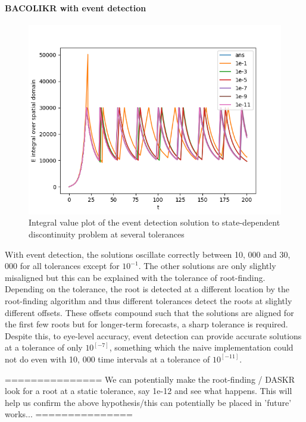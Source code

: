 \documentclass{article}
\begin{document}
\paragraph{BACOLIKR with event detection}
\begin{figure}[H]
\centering
\includegraphics[width=0.7\linewidth]{./figures/pde_state_disc_tol_event}
\caption{Integral value plot of the event detection solution to state-dependent discontinuity problem at several tolerances}
\label{fig:pde_state_disc_tol_event}
\end{figure}

With event detection, the solutions oscillate correctly between 10, 000 and 30, 000 for all tolerances except for $10^{-1}$. The other solutions are only slightly misaligned but this can be explained with the tolerance of root-finding. Depending on the tolerance, the root is detected at a different location by the root-finding algorithm and thus different tolerances detect the roots at slightly different offsets. These offsets compound such that the solutions are aligned for the first few roots but for longer-term forecasts, a sharp tolerance is required. Despite this, to eye-level accuracy, event detection can provide accurate solutions at a tolerance of only $10^[-7]$, something which the naive implementation could not do even with 10, 000 time intervals at a tolerance of $10^[-11]$.

===============
We can potentially make the root-finding / DASKR look for a root at a static tolerance, say 1e-12 and see what happens. This will help us confirm the above hypothesis/this can potentially be placed in 'future' works...
===============
\end{document}
